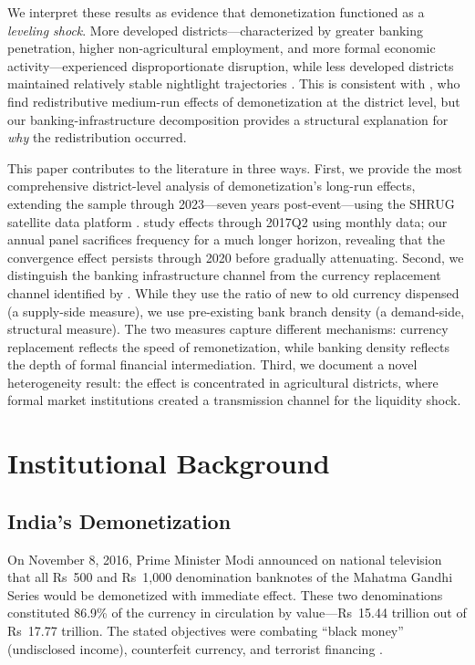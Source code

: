\documentclass[12pt]{article}
\begin{document}
We interpret these results as evidence that demonetization functioned as a \textit{leveling shock}. More developed districts---characterized by greater banking penetration, higher non-agricultural employment, and more formal economic activity---experienced disproportionate disruption, while less developed districts maintained relatively stable nightlight trajectories \citep[cf.][]{dreze2019growth}. This is consistent with \citet{chanda2022was}, who find redistributive medium-run effects of demonetization at the district level, but our banking-infrastructure decomposition provides a structural explanation for \textit{why} the redistribution occurred.

This paper contributes to the literature in three ways. First, we provide the most comprehensive district-level analysis of demonetization's long-run effects, extending the sample through 2023---seven years post-event---using the SHRUG satellite data platform \citep{asher2021shrug}. \citet{chodorow2020cash} study effects through 2017Q2 using monthly data; our annual panel sacrifices frequency for a much longer horizon, revealing that the convergence effect persists through 2020 before gradually attenuating. Second, we distinguish the banking infrastructure channel from the currency replacement channel identified by \citet{chodorow2020cash}. While they use the ratio of new to old currency dispensed (a supply-side measure), we use pre-existing bank branch density (a demand-side, structural measure). The two measures capture different mechanisms: currency replacement reflects the speed of remonetization, while banking density reflects the depth of formal financial intermediation. Third, we document a novel heterogeneity result: the effect is concentrated in agricultural districts, where formal market institutions created a transmission channel for the liquidity shock.



\section{Institutional Background}\label{sec:background}

\subsection{India's Demonetization}

On November 8, 2016, Prime Minister Modi announced on national television that all Rs~500 and Rs~1,000 denomination banknotes of the Mahatma Gandhi Series would be demonetized with immediate effect. These two denominations constituted 86.9\% of the currency in circulation by value---Rs~15.44 trillion out of Rs~17.77 trillion. The stated objectives were combating ``black money'' (undisclosed income), counterfeit currency, and terrorist financing \citep{demonetization2017economic, agarwal2017one}.
\end{document}
